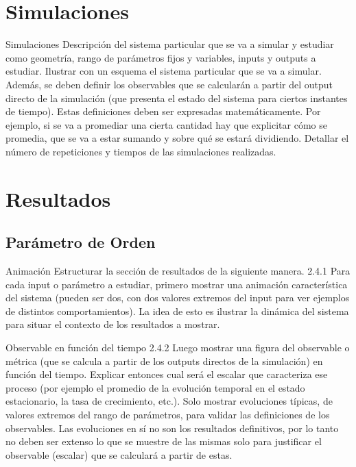 \documentclass{beamer}
\begin{document}
    \section{Simulaciones}

    \begin{frame}{Simulaciones}
        Descripción del sistema particular que se va a simular y estudiar como
        geometría, rango de parámetros fijos y variables, inputs y outputs a estudiar. Ilustrar con un
        esquema el sistema particular que se va a simular.
        Además, se deben definir los observables que se calcularán a partir del output directo de la
        simulación (que presenta el estado del sistema para ciertos instantes de tiempo). Estas
        definiciones deben ser expresadas matemáticamente. Por ejemplo, si se va a promediar una cierta
        cantidad hay que explicitar cómo se promedia, que se va a estar sumando y sobre qué se estará
        dividiendo.
        Detallar el número de repeticiones y tiempos de las simulaciones realizadas.
    \end{frame}

    \section{Resultados}

    \subsection[Parámetro de Orden]{Parámetro de Orden}

    \begin{frame}{Animación}
        Estructurar la sección de resultados de la siguiente manera.
        2.4.1 Para cada input o parámetro a estudiar, primero mostrar una animación característica del
        sistema (pueden ser dos, con dos valores extremos del input para ver ejemplos de distintos
        comportamientos). La idea de esto es ilustrar la dinámica del sistema para situar el contexto de los
        resultados a mostrar.
    \end{frame}

    \begin{frame}{Observable en función del tiempo}
        2.4.2 Luego mostrar una figura del observable o métrica (que se calcula a partir de los outputs
        directos de la simulación) en función del tiempo. Explicar entonces cual será el escalar que
        caracteriza ese proceso (por ejemplo el promedio de la evolución temporal en el estado
        estacionario, la tasa de crecimiento, etc.). Solo mostrar evoluciones típicas, de valores extremos
        del rango de parámetros, para validar las definiciones de los observables. Las evoluciones en sí
        no son los resultados definitivos, por lo tanto no deben ser extenso lo que se muestre de las
        mismas solo para justificar el observable (escalar) que se calculará a partir de estas.
    \end{frame}
\end{document}
